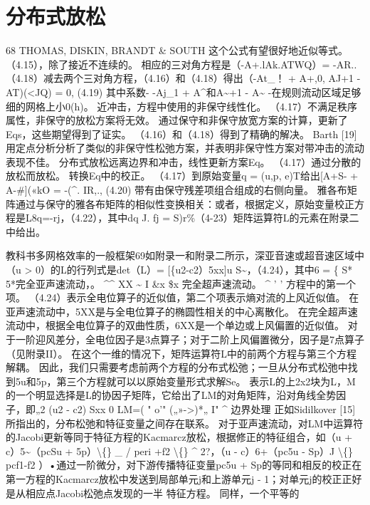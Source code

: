 \documentclass[UTF8,11pt,a4paper,openany,fontset=fandol]{ctexbook}
\begin{document}
\section{分布式放松}
68 THOMAS, DISKIN, BRANDT \& SOUTH 这个公式有望很好地近似等式。 （4.15），除了接近不连续的。 相应的三对角方程是（-A+.lAk.ATWQ）= -AR.. （4.18）减去两个三对角方程，（4.16）和（4.18）得出（-At\_！ + A+,0, AJ+1 - AT)(<JQ) = 0, (4.19) 其中系数- -Aj\_1 + A\textasciicircum{}和A\textasciitilde{}+1 - A\textasciitilde{} -在规则流动区域足够细的网格上小0(h)。 近冲击，方程中使用的非保守线性化。 （4.17）不满足秩序属性，非保守的放松方案将无效。 通过保守和非保守放宽方案的计算，更新了Eqs，这些期望得到了证实。 （4.16）和（4.18）得到了精确的解决。 Barth [19]用定点分析分析了类似的非保守性松弛方案，并表明非保守性方案对带冲击的流动表现不佳。 分布式放松远离边界和冲击，线性更新方案Eq。 （4.17）通过分散的放松而放松。 转换Eq中的校正。 （4.17）到原始变量q = (u,p, e)T给出[A+S- + A-\#](«kO = -(\textasciicircum{}. IR,., (4.20) 带有由保守残差项组合组成的右侧向量。 雅各布矩阵通过与保守的雅各布矩阵的相似性变换相关：或者，根据定义，原始变量校正方程是L8q=-rj，（4.22），其中dq J. fj = S)r\%（4-23）矩阵运算符L的元素在附录二中给出。

教科书多网格效率的一般框架69如附录一和附录二所示，深亚音速或超音速区域中（u > 0）的L的行列式是det（L）= [\{u2-c2）5xx]u S\textasciitilde{}，（4.24），其中6 = \{ S* 5*完全亚声速流动，。 \textasciicircum{}\textasciicircum{} XX \textasciitilde{} I \&x \$x 完全超声速流动。 \textasciicircum{} ' ' 方程中的第一个项。 （4.24）表示全电位算子的近似值，第二个项表示熵对流的上风近似值。 在亚声速流动中，5XX是与全电位算子的椭圆性相关的中心离散化。 在完全超声速流动中，根据全电位算子的双曲性质，6XX是一个单边或上风偏置的近似值。 对于一阶迎风差分，全电位因子是3点算子；对于二阶上风偏置微分，因子是7点算子（见附录II）。 在这个一维的情况下，矩阵运算符L中的前两个方程与第三个方程解耦。 因此，我们只需要考虑前两个方程的分布式松弛；一旦从分布式松弛中找到5u和5p，第三个方程就可以以原始变量形式求解Se。 表示L的上2x2块为L，M的一个明显选择是L的协因子矩阵，它给出了LM的对角矩阵，沿对角线全势因子，即„2 (u2 - c2) Sxx 0 LM=( " o'" („»->)*„ I" \textasciicircum{} 边界处理 正如Sidilkover [15]所指出的，分布松弛和特征变量之间存在联系。 对于亚声速流动，对LM中运算符的Jacobi更新等同于特征方程的Kacmarcz放松，根据修正的特征组合，如（u + c）5\textasciitilde{}（pcSu + 5p）\textbackslash\{\} \_ / peri +f2 \textbackslash\{\} \textasciicircum{} 2?，（u - c）6+（pc5u - Sp）J \textbackslash\{\} pcf1-f2 ）•通过一阶微分，对下游传播特征变量pc5u + Sp的等同和相反的校正在第一方程的Kacmarcz放松中发送到局部单元j和上游单元j - 1；对单元j的校正正好是从相应点Jacobi松弛点发现的一半 特征方程。 同样，一个平等的
\end{document}
